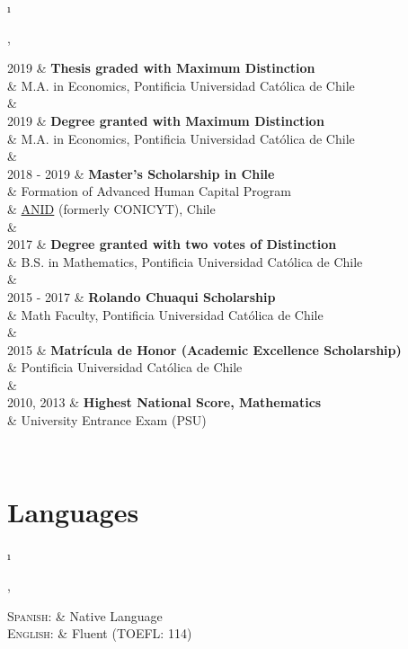 \documentclass[a4paper, margins=2cm,10pt]{article}
\newcommand{\tablength}{}
\newcommand{\setTabParams}[1]{\renewcommand\tablength{}\forcsvlist{\listadd\tablength}{#1}}
\newcommand{\setCols}[1]{			%
	\ifnum0=\i						%
		\ifdim0cm=#1				%
			\def \firstCol {r}		%
		\else						%
			\def \firstCol {p{#1}}		%
		\fi						%
	\else \ifnum1=\i				%
		\ifdim0cm=#1				%
			\def \secondCol {l}		%
		\else						%
			\def \secondCol{p{#1}}	%
		\fi						%
	\else \ifnum2=\i				%
		\ifnum0=#1				%
			\def \sep {}			%
		\else						%
			\def \sep {|}			%
		\fi						%
	\fi \fi \fi						%
	\advance\i by1					%
}
\newcommand{\tab}[1]{					%
	\newcount\i						%
	\forlistloop{\setCols}{\tablength}		%
	\begin{tabular}{\firstCol \sep \secondCol}	%
		#1							%
	\end{tabular} \\						%
}
\begin{document}
\tab{
\textsc{2019}
	&	\textbf{Thesis graded with Maximum Distinction}				\\[0.2ex]
	&	M.A. in Economics, Pontificia Universidad Católica de Chile		\\
	&	\\

\textsc{2019}
	&	\textbf{Degree granted with Maximum Distinction}			\\[0.2ex]
	&	M.A. in Economics, Pontificia Universidad Católica de Chile		\\
	&	\\

\textsc{2018 - 2019} 
	&	\textbf{Master's Scholarship in Chile}						\\[0.2ex]
	&	Formation of Advanced Human Capital Program				\\[0.2ex]
	&	\href{https://www.anid.cl}{ANID} (formerly CONICYT), Chile		\\
	&	\\
	
\textsc{2017}
	&	\textbf{Degree granted with two votes of Distinction}			\\[0.2ex]
	&	B.S. in Mathematics, Pontificia Universidad Católica de Chile		\\
	&	\\

\textsc{2015 - 2017} 
	&	\textbf{Rolando Chuaqui Scholarship}						\\[0.2ex]
	&	Math Faculty, Pontificia Universidad Católica de Chile			\\
	&	\\
	
\textsc{2015}
	&	\textbf{Matrícula de Honor (Academic Excellence Scholarship)}	\\[0.2ex]
	&	Pontificia Universidad Católica de Chile						\\
	&	\\

\textsc{2010, 2013}
	&	\textbf{Highest National Score, Mathematics}				\\[0.2ex]
	&	 University Entrance Exam (PSU)							\\	
}

\section{Languages}
\setTabParams{0cm,0cm,0}

\tab{
\textsc{Spanish:} 
	&	Native Language	\\[0.2ex]

\textsc{English:}
	&	Fluent (TOEFL: 114)
}
\end{document}
